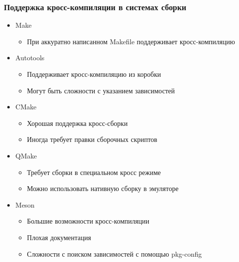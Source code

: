 \documentclass[aspectratio=169]{beamer}
\begin{document}
\begin{frame}
	\frametitle{Поддержка кросс-компиляции в системах сборки}

	\begin{itemize}
		\item Make
		      \begin{itemize}
			      \item При аккуратно написанном Makefile поддерживает кросс-компиляцию
		      \end{itemize}
		\item Autotools
		      \begin{itemize}
			      \item Поддерживает кросс-компиляцию из коробки
			      \item Могут быть сложности с указанием зависимостей
		      \end{itemize}
		\item CMake
		      \begin{itemize}
			      \item Хорошая поддержка кросс-сборки
			      \item Иногда требует правки сборочных скриптов
		      \end{itemize}
		\item QMake
		      \begin{itemize}
			      \item Требует сборки в специальном кросс режиме
			      \item Можно использовать нативную сборку в эмуляторе
		      \end{itemize}
		\item Meson
		      \begin{itemize}
			      \item Большие возможности кросс-компиляции
			      \item Плохая документация
			      \item Сложности с поиском зависимостей с помощью pkg-config
		      \end{itemize}
	\end{itemize}
\end{frame}
\end{document}
